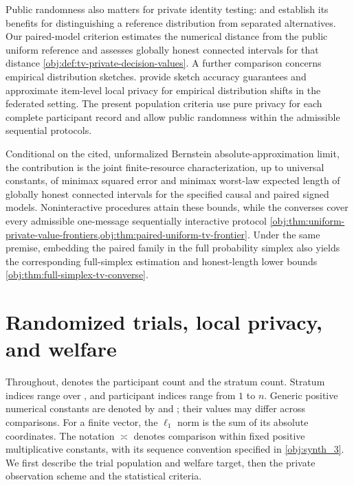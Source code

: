 \documentclass[11pt]{article}
\begin{document}
Public randomness also matters for private identity testing: \citet{AcharyaCanonneFreitagTyagi2019TestWithoutTrust} and \citet{Acharya2021} establish its benefits for distinguishing a reference distribution from separated alternatives. Our paired-model criterion estimates the numerical distance from the public uniform reference and assesses globally honest connected intervals for that distance \cref{obj:def:tv-private-decision-values}. A further comparison concerns empirical distribution sketches. \citet[Theorems~4.6, 4.10, and~4.13]{CormodeTing2025FederatedShift} provide sketch accuracy guarantees and approximate item-level local privacy for empirical distribution shifts in the federated setting. The present population criteria use pure privacy for each complete participant record and allow public randomness within the admissible sequential protocols.

Conditional on the cited, unformalized Bernstein absolute-approximation limit, the contribution is the joint finite-resource characterization, up to universal constants, of minimax squared error and minimax worst-law expected length of globally honest connected intervals for the specified causal and paired signed models. Noninteractive procedures attain these bounds, while the converses cover every admissible one-message sequentially interactive protocol \cref{obj:thm:uniform-private-value-frontiers,obj:thm:paired-uniform-tv-frontier}. Under the same premise, embedding the paired family in the full probability simplex also yields the corresponding full-simplex estimation and honest-length lower bounds \cref{obj:thm:full-simplex-tv-converse}.


\section{Randomized trials, local privacy, and welfare}

Throughout,  denotes the participant count and  the stratum count. Stratum indices range over , and participant indices range from \(1\) to \(n\). Generic positive numerical constants are denoted by  and ; their values may differ across comparisons. For a finite vector, the \(\ell_1\) norm is the sum of its absolute coordinates. The notation \(\asymp\) denotes comparison within fixed positive multiplicative constants, with its sequence convention specified in \cref{obj:synth_3}. We first describe the trial population and welfare target, then the private observation scheme and the statistical criteria.
\end{document}
